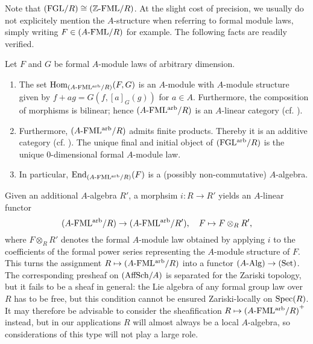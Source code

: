 \documentclass[../main.tex]{subfiles}
\begin{document}
Note that ${(\mathrm{FGL}/{R})} \cong {({\mathbb{Z}}\textnormal-\allowbreak\mathrm{FML}/{R})}$.
At the slight cost of precision, we usually do not explicitely mention the
$A$-structure when referring to formal module laws, simply writing $F \in
{({A}\textnormal-\allowbreak\mathrm{FML}/{R})}$ for example. 
The following facts are readily verified.
\begin{lem}
  Let $F$ and $G$ be formal $A$-module laws of arbitrary dimension.
  \begin{enumerate}
    \item The set $\operatorname{Hom}_{{({A}\textnormal-\allowbreak\mathrm{FML^{arb}}/{R})}} (F,G)$
      is an $A$-module with $A$-module structure
      given by $f+ag = G(f,[a]_G(g))$ for $a \in A$. 
      Furthermore, the composition of morphisms is bilinear; hence
      ${({A}\textnormal-\allowbreak\mathrm{FML^{arb}}/{R})}$ is an $A$-linear category (cf.
      \cite[\href{https://stacks.math.columbia.edu/tag/09MI}{Tag
      09MI}]{stacks-project}). 
    \item Furthermore, ${({A}\textnormal-\allowbreak\mathrm{FML^{arb}}/{R})}$ admits finite products. Thereby it is 
      an additive category (cf.
      \cite[\href{https://stacks.math.columbia.edu/tag/0104}{Tag
      0104}]{stacks-project}).
      The unique final and initial object of ${(\mathrm{FGL^{arb}}/{R})}$ is the unique
      $0$-dimensional formal $A$-module law.
    \item In particular, $\operatorname{End}_{{({A}\textnormal-\allowbreak\mathrm{FML^{arb}}/{R})}}(F)$ is a (possibly non-commutative)
      $A$-algebra.
  \end{enumerate}
\end{lem}

Given an additional $A$-algebra $R'$, a morphsim
$i\colon R \to R'$ yields an $A$-linear functor 
\begin{equation*}
    {({A}\textnormal-\allowbreak\mathrm{FML^{arb}}/{R})} \to {({A}\textnormal-\allowbreak\mathrm{FML^{arb}}/{R'})}, \quad
    F \mapsto F \otimes_R R',
\end{equation*}
where $F \otimes_R R'$ denotes the formal $A$-module law obtained by applying $i$
to the coefficients of the formal power series representing the $A$-module structure of $F$. 
This turns the assignment $R \mapsto {({A}\textnormal-\allowbreak\mathrm{FML^{arb}}/{R})}$ into a 
functor ${({A}\textnormal-\allowbreak\mathrm{Alg})} \to {(\mathrm{Set})}$. The corresponding presheaf on ${(\mathrm{AffSch}/{A})}$ is
separated for the Zariski topology, 
but it fails to be a sheaf in general: the Lie algebra of any
formal group law over $R$ has to be free, but this condition cannot be 
ensured Zariski-locally on $\operatorname{Spec}(R)$. It may therefore be 
advisable to consider the sheafification $R \mapsto {({A}\textnormal-\allowbreak\mathrm{FML^{arb}}/{R})}^+$ instead,
but in our applications
$R$ will almost always be a local $A$-algebra, so considerations
of this type will not play a large role.
\end{document}
